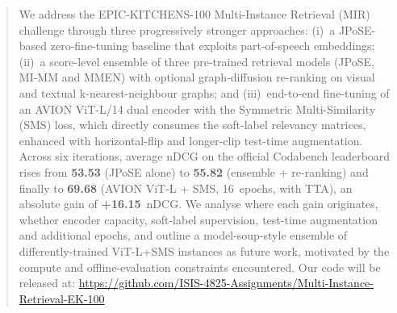 \begin{abstract}
We address the EPIC-KITCHENS-100 Multi-Instance Retrieval (MIR) challenge through three progressively stronger approaches: (i)~a JPoSE-based zero-fine-tuning baseline that exploits part-of-speech embeddings; (ii)~a score-level ensemble of three pre-trained retrieval models (JPoSE, MI-MM and MMEN) with optional graph-diffusion re-ranking on visual and textual k-nearest-neighbour graphs; and (iii)~end-to-end fine-tuning of an AVION ViT-L/14 dual encoder with the Symmetric Multi-Similarity (SMS) loss, which directly consumes the soft-label relevancy matrices, enhanced with horizontal-flip and longer-clip test-time augmentation. Across six iterations, average nDCG on the official Codabench leaderboard rises from \textbf{53.53} (JPoSE alone) to \textbf{55.82} (ensemble + re-ranking) and finally to \textbf{69.68} (AVION ViT-L + SMS, 16~epochs, with TTA), an absolute gain of \textbf{+16.15}~nDCG. We analyse where each gain originates, whether encoder capacity, soft-label supervision, test-time augmentation and additional epochs, and outline a model-soup-style ensemble of differently-trained ViT-L+SMS instances as future work, motivated by the compute and offline-evaluation constraints encountered. Our code will be released at: \href{https://github.com/ISIS-4825-Assignments/Multi-Instance-Retrieval-EK-100}{https://github.com/ISIS-4825-Assignments/Multi-Instance-Retrieval-EK-100}
\end{abstract}